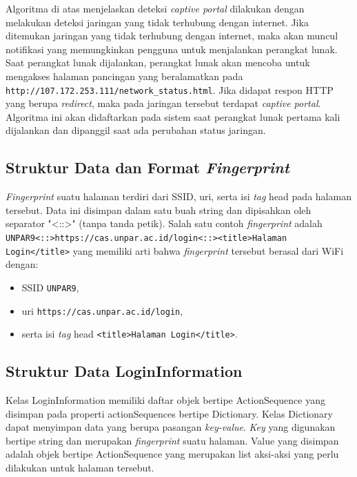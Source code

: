 \hfill

Algoritma di atas menjelaskan deteksi \textit{captive portal} dilakukan dengan melakukan deteksi jaringan yang tidak terhubung dengan internet. Jika ditemukan jaringan yang tidak terhubung dengan internet, maka akan muncul notifikasi yang memungkinkan pengguna untuk menjalankan perangkat lunak. Saat perangkat lunak dijalankan, perangkat lunak akan mencoba untuk mengakses halaman pancingan yang beralamatkan pada \texttt{http://107.172.253.111/network\_status.html}. Jika didapat respon HTTP yang berupa \textit{redirect}, maka pada jaringan tersebut terdapat \textit{captive portal}. Algoritma ini akan didaftarkan pada sistem saat perangkat lunak pertama kali dijalankan dan dipanggil saat ada perubahan status jaringan.

\subsection{Struktur Data dan Format \textit{Fingerprint}}
\label{subsec:struktur_data_dan_format_fingerprint}

\textit{Fingerprint} suatu halaman terdiri dari SSID, uri, serta isi \textit{tag} head pada halaman tersebut. Data ini disimpan dalam satu buah string dan dipisahkan oleh separator "<::>" (tanpa tanda petik). Salah satu contoh \textit{fingerprint} adalah \texttt{UNPAR9<::>https://cas.unpar.ac.id/login<::><title>Halaman Login</title>} yang memiliki arti bahwa \textit{fingerprint} tersebut berasal dari WiFi dengan:

\begin{itemize}
    \item{SSID \texttt{UNPAR9},}
    \item{uri \texttt{https://cas.unpar.ac.id/login},}
    \item{serta isi \textit{tag} head \texttt{<title>Halaman Login</title>}.}
\end{itemize}

\subsection{Struktur Data LoginInformation}
\label{subsec:struktur_data_logininformation}

Kelas LoginInformation memiliki daftar objek bertipe ActionSequence yang disimpan pada properti actionSequences bertipe Dictionary. Kelas Dictionary dapat menyimpan data yang berupa pasangan \textit{key-value}. \textit{Key} yang digunakan bertipe string dan merupakan \textit{fingerprint} suatu halaman. Value yang disimpan adalah objek bertipe ActionSequence yang merupakan list aksi-aksi yang perlu dilakukan untuk halaman tersebut.

